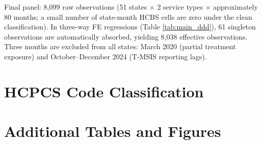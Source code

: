 \documentclass[12pt]{article}
\begin{document}
Final panel: 8,099 raw observations (51 states $\times$ 2 service types $\times$ approximately 80 months; a small number of state-month HCBS cells are zero under the clean classification). In three-way FE regressions (Table \ref{tab:main_ddd}), 61 singleton observations are automatically absorbed, yielding 8,038 effective observations. Three months are excluded from all states: March 2020 (partial treatment exposure) and October--December 2024 (T-MSIS reporting lags).


\section{HCPCS Code Classification}
\label{app:hcpcs}




\section{Additional Tables and Figures}
\label{app:additional}


\end{document}
